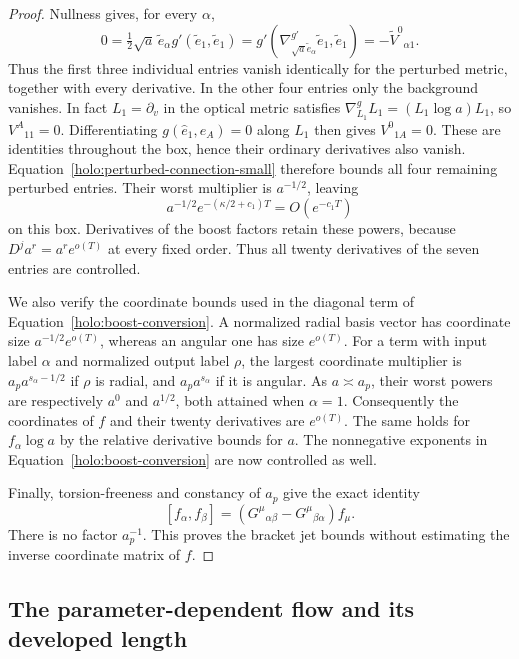 \begin{proof}
Nullness gives, for every $\alpha$,
\[
 0=\tfrac12\sqrt a\,\widetilde e_\alpha
                   g'(\widetilde e_1,\widetilde e_1)
   =g'(\nabla^{g'}_{\sqrt a\widetilde e_\alpha}
                     \widetilde e_1,\widetilde e_1)
   =-\widetilde V^0{}_{\alpha1}.
\]
Thus the first three individual entries vanish identically for the
perturbed metric, together with every derivative.  In the other
four entries only the background vanishes.  In fact
$L_1=\partial_v$ in the optical metric satisfies
$\nabla^g_{L_1}L_1=(L_1\log a)L_1$, so
$V^A{}_{11}=0$.  Differentiating
$g(\hat e_1,e_A)=0$ along $L_1$ then gives
$V^0{}_{1A}=0$.  These are identities throughout the box, hence
their ordinary derivatives also vanish.  Equation~\eqref{holo:perturbed-connection-small}
therefore bounds all four remaining perturbed entries.  Their
worst multiplier is $a^{-1/2}$, leaving
\[
 a^{-1/2}e^{-(\kappa/2+c_1)T}=O(e^{-c_1T})
\]
on this box.  Derivatives of the boost factors retain these powers,
because $D^j a^r=a^r e^{o(T)}$ at every fixed order.  Thus all
twenty derivatives of the seven entries are controlled.

We also verify the coordinate bounds used in the diagonal term of
Equation~\eqref{holo:boost-conversion}.  A normalized radial basis
vector has coordinate size $a^{-1/2}e^{o(T)}$, whereas an angular
one has size $e^{o(T)}$.  For a term with input label $\alpha$
and normalized output label $\rho$, the largest coordinate
multiplier is $a_pa^{s_\alpha-1/2}$ if $\rho$ is radial, and
$a_pa^{s_\alpha}$ if it is angular.  As $a\asymp a_p$, their
worst powers are respectively $a^0$ and $a^{1/2}$, both attained
when $\alpha=1$.  Consequently the coordinates of $f$ and their
twenty derivatives are $e^{o(T)}$.  The same holds for
$f_\alpha\log a$ by the relative derivative bounds for $a$.
The nonnegative exponents in Equation~\eqref{holo:boost-conversion}
are now controlled as well.

Finally, torsion-freeness and constancy of $a_p$ give the exact
identity
\begin{equation}\label{holo:bracket}
 [f_\alpha,f_\beta]
    =(G^\mu{}_{\alpha\beta}-G^\mu{}_{\beta\alpha})f_\mu.
\end{equation}
There is no factor $a_p^{-1}$.  This proves the bracket jet bounds
without estimating the inverse coordinate matrix of $f$.
\end{proof}

\subsection{The parameter-dependent flow and its developed length}

